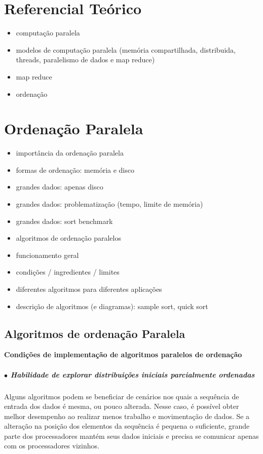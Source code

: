 \chapter{Referencial Teórico}
\label{cap:referencial}

\begin{itemize}
\item computação paralela
\item modelos de computação paralela (memória compartilhada, distribuida, threads, paralelismo de dados e map reduce)
\item map reduce
\item ordenação
\end{itemize}




\chapter{Ordenação Paralela}
\label{cap:ordenacao}

\begin{itemize}
\item importância da ordenação paralela
\item formas de ordenação: memória e disco
\item grandes dados: apenas disco
\item grandes dados: problematização (tempo, limite de memória)
\item grandes dados: sort benchmark
\end{itemize}


\begin{itemize}
\item algoritmos de ordenação paralelos
\item funcionamento geral 
\item condições / ingredientes / limites
\item diferentes algoritmos para diferentes aplicações
\item descrição de algoritmos (e diagramas): sample sort, quick sort

\end{itemize}
\section{Algoritmos de ordenação Paralela}

\textbf{Condições de implementação de algoritmos paralelos de ordenação}

\paragraph*{ $\bullet$ Habilidade de explorar distribuições iniciais parcialmente ordenadas}
Alguns algoritmos podem se beneficiar de cenários nos quais a sequência de entrada dos dados é mesma, ou pouco alterada. Nesse caso, é possível obter melhor desempenho ao realizar menos trabalho e movimentação de dados. 
Se a alteração na posição dos elementos da sequência é pequena o suficiente, grande parte dos processadores mantém seus dados iniciais e precisa se comunicar apenas com os processadores vizinhos.


